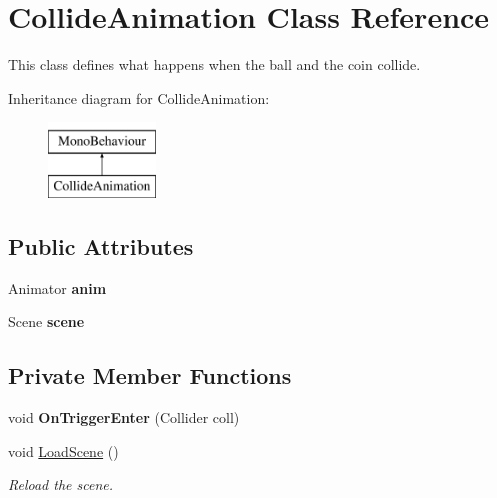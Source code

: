 \hypertarget{class_collide_animation}{}\section{Collide\+Animation Class Reference}
\label{class_collide_animation}


This class defines what happens when the ball and the coin collide.  


Inheritance diagram for Collide\+Animation\+:\begin{figure}[H]
\begin{center}
\leavevmode
\includegraphics[height=2.000000cm]{class_collide_animation}
\end{center}
\end{figure}
\subsection*{Public Attributes}
\begin{DoxyCompactItemize}
\item 
\mbox{\label{class_collide_animation_ab9e033b5300d69ad20105c3b023c6587}} 
Animator {\bfseries anim}
\item 
\mbox{\label{class_collide_animation_a82cce7be9720f549e3caf2891187b61f}} 
Scene {\bfseries scene}
\end{DoxyCompactItemize}
\subsection*{Private Member Functions}
\begin{DoxyCompactItemize}
\item 
\mbox{\label{class_collide_animation_aeb67d540963c758c6a193a5e8224898d}} 
void {\bfseries On\+Trigger\+Enter} (Collider coll)
\item 
void \mbox{\hyperlink{class_collide_animation_afc39a27ba15b21702c2ba2d9a20faae8}{Load\+Scene}} ()
\begin{DoxyCompactList}\small\item\em Reload the scene. \end{DoxyCompactList}\end{DoxyCompactItemize}


